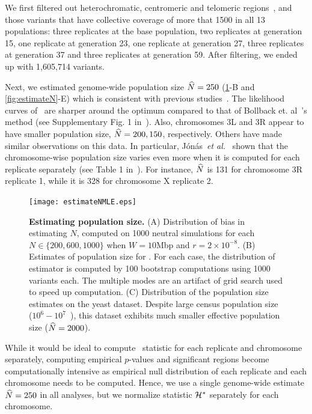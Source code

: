 \documentclass[9pt,twocolumn,twoside]{gsajnl}
\begin{document}
We first filtered out heterochromatic, centromeric and telomeric
regions~\cite{fiston2010drosophila}, and those variants that have
collective coverage of more that 1500 in all 13 populations: three
replicates at the base population, two replicates at generation 15,
one replicate at generation 23, one replicate at generation 27, three
replicates at generation 37 and three replicates at generation
59. After filtering, we ended up with 1,605,714 variants.

Next, we estimated genome-wide population size $\widehat{N}=250$
(\ref{fig:estimateNMLE}-B and \ref{fig:estimateN}-E) which is consistent with 
previous
studies~\cite{orozco2012adaptation,jonas2016estimating}. The
likelihood curves of \comale\ are sharper around the optimum compared
to that of Bollback et. al~\cite{bollback2008estimation}'s method (see
Supplementary Fig. 1 in~\cite{orozco2012adaptation}).  Also,
chromosomes 3L and 3R appear to have smaller population
size, $\widehat{N}=200,150$, respectively. 
Others have
made similar observations on this data. In particular,
J\'{o}n\'{a}s~\emph{et al.}~\cite{jonas2016estimating} shown that the 
chromosome-wise population
size varies even more when it is computed for each replicate
separately (see Table 1 in~\cite{jonas2016estimating}). For instance,
$\widehat{N}$ is 131 for chromosome 3R replicate 1, while it is 328 for chromosome 
X 
replicate 2.  

\begin{figure}
	\centering
	\texttt{[image: estimateNMLE.eps]}
	\caption{{\bf Estimating population size.}  (A) Distribution
		of bias in estimating $N$, computed on 1000 neutral
		simulations for each $N\in\{200,600,1000\}$ when $W=10$Mbp and 
		$r=2\times10^{-8}$. (B) 
		Estimates
		of population size for \datadm. For each case, the
		distribution of estimator is computed by 100 bootstrap
		computations using 1000 variants each. The multiple modes
		are an artifact of grid search used to speed up
		computation. (C) Distribution of the population 	size
		estimates on the yeast dataset.  Despite large census
		population size ($10^6-10^7$~\cite{burke2014standing}), this
		dataset exhibits much smaller effective population size
		($\widehat{N}=2000$). }
	\label{fig:estimateNMLE}
\end{figure}

While it would be ideal to compute \comale\ statistic for each
replicate and chromosome separately, computing empirical $p$-values
and significant regions become computationally intensive as empirical
null distribution of each replicate and each chromosome needs to be
computed.  Hence, we use a single genome-wide estimate $\widehat{N}=250$ in
all analyses, but we normalize statistic ${\cal H}^*$ separately for each
chromosome.
\end{document}
